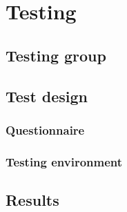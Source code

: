 \chapter{Testing}
\section{Testing group}
\section{Test design}
\subsection{Questionnaire}
\subsection{Testing environment}
\section{Results}